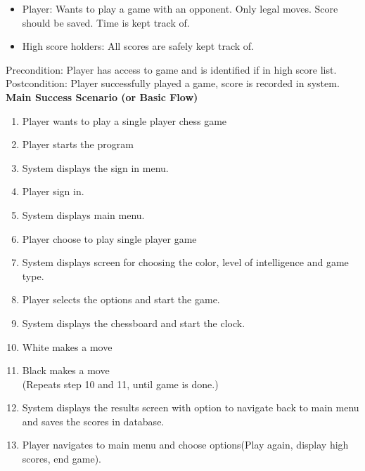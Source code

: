 \documentclass{article}
\begin{document}
\begin{flushleft}
\begin{itemize}	
	\item Player: Wants to play a game with an opponent. Only legal moves. Score should be saved. Time is kept track of.\\	
	\item High score holders: All scores are safely kept track of.	
\end{itemize}

	Precondition: Player has access to game and is identified if in high score list.\\
	\vspace{1mm}
	Postcondition: Player successfully played a game, score is recorded in system.\\
	\vspace{2mm}
	\textbf{Main Success Scenario (or Basic Flow)}\\

\begin{enumerate}	
\item	 Player wants to play a single player chess game
\item 	 Player starts the program
\item 	 System displays the sign in menu.
\item 	 Player sign in.
\item    System displays main menu.
\item    Player choose to play single player game
\item 	 System displays screen for choosing the color, level of intelligence and game type.
\item    Player selects the options and start the game.
\item    System displays the chessboard and start the clock. 
\item 	 White makes a move
\item	 Black makes a move\\
(Repeats step 10 and 11, until game is done.)
\item    System displays the results screen with option to navigate back to main menu and saves the scores in database.
\item 	 Player navigates to main menu and choose options(Play again, display high scores, end game).
\end{enumerate}



\end{flushleft}
\end{document}
